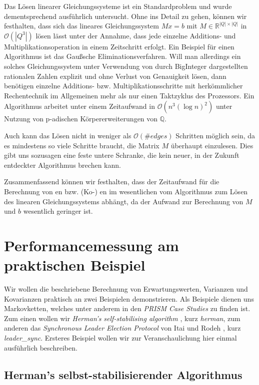 \documentclass[a4paper]{article}
\theoremstyle{nonumberplain}
\begin{document}
Das Lösen linearer Gleichungssysteme ist ein Standardproblem und wurde dementsprechend ausführlich untersucht. Ohne ins Detail zu gehen, können wir festhalten, dass sich das lineares Gleichungssystem $Mx = b$ mit $M \in \mathbb{R}^{|Q|\times|Q|}$  in $\mathcal{O}(|Q^3|)$ lösen lässt unter der Annahme, dass jede einzelne Additions- und Multiplikationsoperation in einem Zeitschritt erfolgt. Ein Beispiel für einen Algorithmus ist das Gaußsche Eliminationsverfahren. Will man allerdings ein solches Gleichungssystem unter Verwendung von durch BigInteger dargestellten rationalen Zahlen explizit und ohne Verlust von Genauigkeit lösen, dann benötigen einzelne Additions- bzw. Multiplikationsschritte mit herkömmlicher Rechentechnik im Allgemeinen mehr als nur einen Taktzyklus des Prozessors. Ein Algorithmus \cite{Dixon1982} arbeitet unter einem Zeitaufwand in $\mathcal{O}(n^3(\log n)^2)$ unter Nutzung von p-adischen Körper\-er\-wei\-ter\-ung\-en von $\mathbb{Q}$.

Auch kann das Lösen nicht in weniger als $\mathcal{O}(\#edges)$ Schritten möglich sein, da es mindestens so viele Schritte braucht, die Matrix $M$ überhaupt einzulesen. Dies gibt uns sozusagen eine feste untere Schranke, die kein neuer, in der Zukunft entdeckter Algorithmus brechen kann. 

Zusammenfassend können wir festhalten, dass der Zeitaufwand für die Berechnung von \expect{}en bzw. (Ko-) \var{}en im wesentlichen vom Algorithmus zum Lösen des linearen Gleichungssystems abhängt, da der Aufwand zur Berechnung von $M$ und $b$ wesentlich geringer ist. 


\section{Performancemessung am praktischen Beispiel}

Wir wollen die beschriebene Berechnung von Erwartungswerten, Varianzen und Kovarianzen praktisch an zwei Beispielen demonstrieren. Als Beispiele dienen uns Markovketten, welches unter anderem in den \textit{PRISM Case Studies} \cite{PRISMCS} zu finden ist. Zum einen wollen wir \textit{Herman's self-stabilising algorithm} \cite{Her90}, kurz \textit{herman}, zum anderen das \textit{Synchronous Leader Election Protocol} von Itai und Rodeh \cite{IR90}, kurz \textit{leader\_sync}. Ersteres Beispiel wollen wir zur Veranschaulichung hier einmal ausführlich beschreiben.

\subsection{Herman's selbst-stabilisierender Algorithmus}
\end{document}
